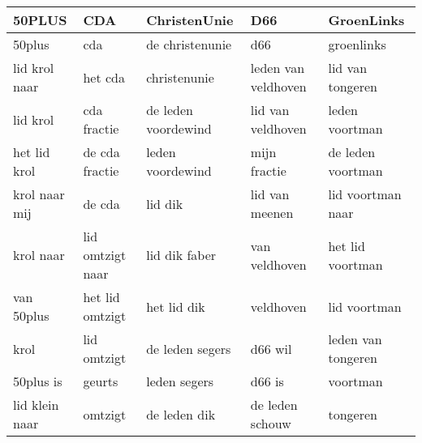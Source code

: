 \begin{tabular}{lllll}
\toprule
         50PLUS &               CDA &         ChristenUnie &                  D66 &          GroenLinks \\
\midrule
         50plus &               cda &      de christenunie &                  d66 &          groenlinks \\
  lid krol naar &           het cda &         christenunie &  leden van veldhoven &    lid van tongeren \\
       lid krol &       cda fractie &  de leden voordewind &    lid van veldhoven &      leden voortman \\
   het lid krol &    de cda fractie &     leden voordewind &         mijn fractie &   de leden voortman \\
  krol naar mij &            de cda &              lid dik &       lid van meenen &   lid voortman naar \\
      krol naar &  lid omtzigt naar &        lid dik faber &        van veldhoven &    het lid voortman \\
     van 50plus &   het lid omtzigt &          het lid dik &            veldhoven &        lid voortman \\
           krol &       lid omtzigt &      de leden segers &              d66 wil &  leden van tongeren \\
      50plus is &            geurts &         leden segers &               d66 is &            voortman \\
 lid klein naar &           omtzigt &         de leden dik &      de leden schouw &            tongeren \\
\bottomrule
\end{tabular}
